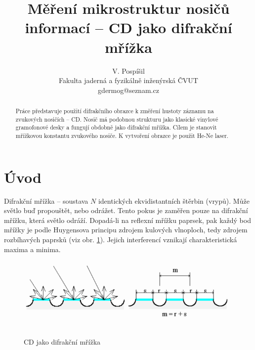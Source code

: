 \documentclass[12pt,a4paper]{article}
\begin{document}
\title{Měření mikrostruktur nosičů informací -- CD jako difrakční mřížka}
\author{V. Pospíšil\\Fakulta jaderná a fyzikálně inženýrská ČVUT\\gdermog@seznam.cz}
\date{}
\maketitle
\thispagestyle{empty}
\begin{abstract}
Práce představuje použití difrakčního obrazce k změření hustoty záznamu na zvukových nosičích -- CD. Nosič má podobnou strukturu jako klasické vinylové gramofonové desky a  fungují obdobně jako difrakční mřížka. Cílem je stanovit mřížkovou konstantu zvukového nosiče. K vytvoření obrazce je použit He-Ne laser.
\end{abstract}

\section{Úvod}
Difrakční mřížka -- soustava $N$ identických ekvidistantních štěrbin (vrypů). Může
světlo buď propouštět, nebo odrážet. Tento pokus je zaměřen pouze na difrakční
mřížku, která světlo odráží. Dopadá-li na reflexní mřížku paprsek, pak každý
bod mřížky je podle Huygensova principu zdrojem kulových vlnoploch, tedy
zdrojem rozbíhavých paprsků (viz obr. \ref{fig1}). Jejich interferencí 
vznikají charakteristická maxima a minima. 

\begin{figure}[ht]
\centering
\includegraphics[width=0.48\textwidth]{Image2}
\includegraphics[width=0.48\textwidth]{Image1}
\vspace{-24pt}
\caption{CD jako difrakční mřížka} \label{fig1}
\end{figure} 
\end{document}
